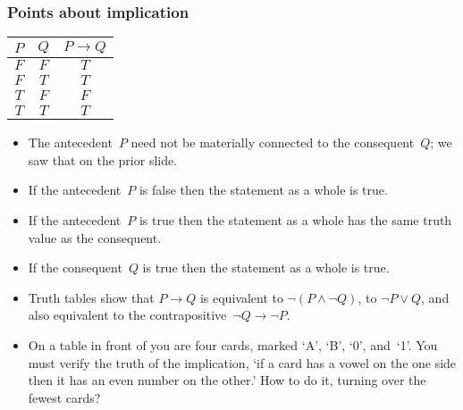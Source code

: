 \documentclass[10pt,t]{beamer}
\begin{document}
\begin{frame}
\frametitle{Points about implication}
\begin{center}
  \begin{tabular}{cc|c}
    $P$  &$Q$  &$P \rightarrow Q$  \\ \hline
    $F$  &$F$  &$T$          \\
    $F$  &$T$  &$T$          \\
    $T$  &$F$  &$F$          \\
    $T$  &$T$  &$T$     
  \end{tabular}
\end{center}
\begin{itemize}
\item The antecedent~$P$ need not be materially connected to the 
  consequent~$Q$; 
  we saw that on the prior slide.
\pause
\item If the antecedent~$P$ is false then the statement as a whole is true.
\pause
\item If the antecedent~$P$ is true then the statement as a whole has the
  same truth value as the consequent.
\pause
\item If the consequent~$Q$ is true then the statement as a whole is true. 
\pause
\item Truth tables show that $P\rightarrow Q$
  is equivalent to $\neg(P\wedge \neg Q)$, 
  to $\neg P\vee Q$,
  and also equivalent to the \alert{contrapositive}~$\neg Q\rightarrow \neg P$.
\pause
\item 
  On a table in front of you are four cards, 
  marked `A', `B', `0', and~`1'.
  You must verify the truth of the implication, 
  `if a card has a vowel on the one side 
  then it has an even number on the other.'  
  How to do it, turning over the fewest cards?
\end{itemize}


\end{frame}
\end{document}

